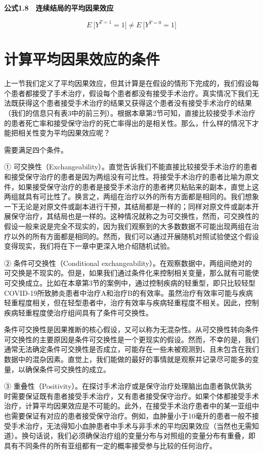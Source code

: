 \documentclass[
  chinese-hans,
  letterpaper,
  DIV=11,
  numbers=noendperiod]{scrreprt}
\begin{document}
\textbf{公式1.8　连续结局的平均因果效应}

\[{E{\ \lbrack}Y}^{T = 1} = 1\rbrack \neq E{\ \lbrack}Y^{T = 0} = 1\rbrack\]

\section{计算平均因果效应的条件}\label{ux8ba1ux7b97ux5e73ux5747ux56e0ux679cux6548ux5e94ux7684ux6761ux4ef6}

上一节我们定义了平均因果效应，但其计算是在假设的情形下完成的，我们假设每个患者都接受了手术治疗，假设每个患者都没有接受手术治疗。真实情况下我们无法既获得这个患者接受手术治疗的结果又获得这个患者没有接受手术治疗的结果（我们的信息只有表3中的前三列）。根据本章第2节可知，直接比较接受手术治疗的患者死亡率和接受保守治疗的死亡率得出的是相关性。那么，什么样的情况下才能把相关性变为平均因果效应呢？

需要满足四个条件。

①
可交换性（Exchangeability）。直觉告诉我们不能直接比较接受手术治疗的患者和接受保守治疗的患者是因为两组没有可比性。将接受手术治疗的患者比喻为原文件，如果接受保守治疗的患者是接受手术治疗的患者拷贝粘贴来的副本，直觉上这两组就具有可比性了。换言之，两组在治疗以外的所有方面都是相同的。我们想象一下无论是对原文件或副本进行干预，其结局都是一样的；同样对原文件或副本开展保守治疗，其结局也是一样的。这种情况就称之为可交换性，然而，可交换性的假设一般来说是完全不现实的，因为我们观察到的大多数数据不可能出现两组在治疗以外的所有方面都是相同的。然而，我们可以通过开展随机对照试验使这个假设变得现实，我们将在下一章中更深入地介绍随机试验。

② 条件可交换性（Conditional
exchangeability）。在观察数据中，两组间绝对的可交换是不现实的。但是，如果我们通过条件化来控制相关变量，那么就有可能使可交换成立。比如在本章第3节的案例中，通过控制疾病的轻重型，即只比较轻型COVID-19所致肺炎患者中治疗A和治疗B的有效率。虽然治疗有效率可能与疾病轻重程度相关，但在轻型患者中，治疗有效率与疾病轻重程度不相关。因此，控制疾病轻重程度使治疗组间具有了条件可交换性。

条件可交换性是因果推断的核心假设，又可以称为无混杂性。从可交换性转向条件可交换性的主要原因是条件可交换性是一个更现实的假设。然而，不幸的是，我们通常无法确定条件可交换性是否成立，可能存在一些未被观测到、且未包含在我们数据中的混杂因素。直觉上，我们能做的最好的事情就是观察并记录尽可能多的变量，以确保条件可交换性的成立。

③
重叠性（Positivity）。在探讨手术治疗或是保守治疗处理脑出血患者孰优孰劣时需要保证既有患者接受手术治疗，又有患者接受保守治疗。如果个体都接受手术治疗，计算平均因果效应是不可能的。此外，在接受手术治疗患者中的某一亚组中也需要保证有对应的患者接受保守治疗。例如，血肿量小于10毫升的患者一般不接受手术治疗，无法得知小血肿患者中手术与非手术的平均因果效应（当然也无需知道）。换句话说，我们必须确保治疗组的变量分布与对照组的变量分布有重叠，即具有不同条件的所有亚组都有一定的概率接受参与比较的任何治疗。
\end{document}

